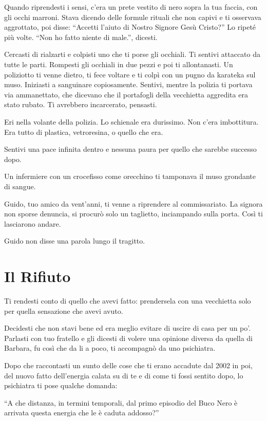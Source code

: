 Quando riprendesti i sensi, c'era un prete vestito di nero sopra la tua faccia, con gli occhi marroni. Stava dicendo delle formule rituali che non capivi e ti osservava aggrottato, poi disse: “Accetti l'aiuto di Nostro Signore Gesù Cristo?” Lo ripeté più volte. “Non ho fatto niente di male.”, dicesti.

Cercasti di rialzarti e colpisti uno che ti porse gli occhiali. Ti sentivi attaccato da tutte le parti. Rompesti gli occhiali in due pezzi e poi ti allontanasti. Un poliziotto ti venne dietro, ti fece voltare e ti colpì con un pugno da karateka sul muso. Iniziasti a sanguinare copiosamente. Sentivi, mentre la polizia ti portava via ammanettato, che dicevano che il portafogli della vecchietta aggredita era stato rubato. Ti avrebbero incarcerato, pensasti.

Eri nella volante della polizia. Lo schienale era durissimo. Non c'era imbottitura. Era tutto di plastica, vetroresina, o quello che era.

Sentivi una pace infinita dentro e nessuna paura per quello che sarebbe successo dopo.

Un infermiere con un crocefisso come orecchino ti tamponava il muso grondante di sangue.

Guido, tuo amico da vent'anni, ti venne a riprendere al commissariato. La signora non sporse denuncia, si procurò solo un taglietto, inciampando sulla porta. Così ti lasciarono andare.

Guido non disse una parola lungo il tragitto.

\section{Il Rifiuto}
\label{il_rifiuto}

Ti rendesti conto di quello che avevi fatto: prendersela con una vecchietta solo per quella sensazione che avevi avuto.

Decidesti che non stavi bene ed era meglio evitare di uscire di casa per un po'. Parlasti con tuo fratello e gli dicesti di volere una opinione diversa da quella di Barbara, fu così che da li a poco, ti accompagnò da uno psichiatra.

Dopo che raccontasti un sunto delle cose che ti erano accadute dal 2002 in poi, del nuovo fatto dell'energia calata su di te e di come ti fossi sentito dopo, lo psichiatra ti pose qualche domanda:

“A che distanza, in termini temporali, dal primo episodio del Buco Nero è arrivata questa energia che le è caduta addosso?”

